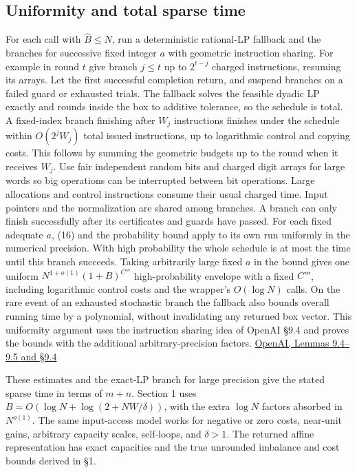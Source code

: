 \documentclass[11pt]{article}
\begin{document}
\hypertarget{uniformity-and-total-sparse-time}{%
\subsection{Uniformity and total sparse time}\label{uniformity-and-total-sparse-time}}

For each call with \(\widehat B\le N\), run a deterministic rational-LP fallback and the branches for successive fixed integer \(a\) with geometric instruction sharing. For example in round \(t\) give branch \(j\le t\) up to \(2^{t-j}\) charged instructions, resuming its arrays. Let the first successful completion return, and suspend branches on a failed guard or exhausted trials. The fallback solves the feasible dyadic LP exactly and rounds inside the box to additive tolerance, so the schedule is total. A fixed-index branch finishing after \(W_j\) instructions finishes under the schedule within \(O(2^j W_j)\) total issued instructions, up to logarithmic control and copying costs. This follows by summing the geometric budgets up to the round when it receives \(W_j\). Use fair independent random bits and charged digit arrays for large words so big operations can be interrupted between bit operations. Large allocations and control instructions consume their usual charged time. Input pointers and the normalization are shared among branches. A branch can only finish successfully after its certificates and guards have passed. For each fixed adequate \(a\), (16) and the probability bound apply to its own run uniformly in the numerical precision. With high probability the whole schedule is at most the time until this branch succeeds. Taking arbitrarily large fixed \(a\) in the bound gives one uniform \(N^{1+o(1)}(1+B)^{C'''}\) high-probability envelope with a fixed \(C'''\), including logarithmic control costs and the wrapper's \(O(\log N)\) calls. On the rare event of an exhausted stochastic branch the fallback also bounds overall running time by a polynomial, without invalidating any returned box vector. This uniformity argument uses the instruction sharing idea of OpenAI §9.4 and proves the bounds with the additional arbitrary-precision factors. \href{https://raw.githubusercontent.com/openai/math/adc7f1241b42e322a6451854ab7e4b4c146bf78a/preprints/Almost-Linear-Time-Maximum-Cardinality-Matching-in-Sparse-General-Graphs-September-24-2026/main.pdf\#page=78}{OpenAI, Lemmas 9.4--9.5 and §9.4}

These estimates and the exact-LP branch for large precision give the stated sparse time in terms of \(m+n\). Section 1 uses \(B=O(\log N+\log(2+NW/\delta))\), with the extra \(\log N\) factors absorbed in \(N^{o(1)}\). The same input-access model works for negative or zero costs, near-unit gains, arbitrary capacity scales, self-loops, and \(\delta>1\). The returned affine representation has exact capacities and the true unrounded imbalance and cost bounds derived in §1.
\end{document}
